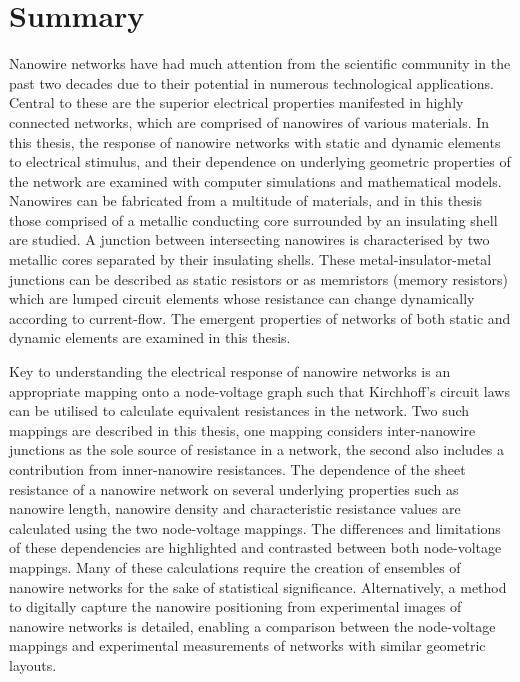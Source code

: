 

\begingroup
\let\clearpage\relax
\let\cleardoublepage\relax
\let\cleardoublepage\relax
\onehalfspacing
\chapter*{Summary} %

Nanowire networks have had much attention from the scientific community in the past two decades due to their potential in numerous technological applications. Central to these are the superior electrical properties manifested in highly connected networks, which are comprised of nanowires of various materials. In this thesis, the response of nanowire networks with static and dynamic elements to electrical stimulus, and their dependence on underlying geometric properties of the network are examined with computer simulations and mathematical models. Nanowires can be fabricated from a multitude of materials, and in this thesis those comprised of a metallic conducting core surrounded by an insulating shell are studied. A junction between intersecting nanowires is characterised by two metallic cores separated by their insulating shells. These metal-insulator-metal junctions can be described as static resistors or as memristors (memory resistors) which are lumped circuit elements whose resistance can change dynamically according to current-flow. The emergent properties of networks of both static and dynamic elements are examined in this thesis.

Key to understanding the electrical response of nanowire networks is an appropriate mapping onto a node-voltage graph such that Kirchhoff's circuit laws can be utilised to calculate equivalent resistances in the network. Two such mappings are described in this thesis, one mapping considers inter-nanowire junctions as the sole source of resistance in a network, the second also includes a contribution from inner-nanowire resistances. The dependence of the sheet resistance of a nanowire network on several underlying properties such as nanowire length, nanowire density and characteristic resistance values are calculated using the two node-voltage mappings. The differences and limitations of these dependencies are highlighted and contrasted between both node-voltage mappings. Many of these calculations require the creation of ensembles of nanowire networks for the sake of statistical significance. Alternatively, a method to digitally capture the nanowire positioning from experimental images of nanowire networks is detailed, enabling a comparison between the node-voltage mappings and experimental measurements of networks with similar geometric layouts. 

